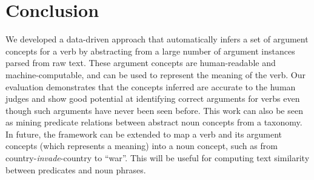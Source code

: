 \section{Conclusion}
\label{sec:conclude}
We developed a data-driven approach that automatically
infers a set of argument concepts for a verb by abstracting from a large
number of argument instances parsed from raw text.
These argument concepts are human-readable and machine-computable,
and can be used to represent the meaning of the verb.
Our evaluation demonstrates that the concepts inferred are
accurate to the human judges and show good potential at
identifying correct arguments for verbs even though such
arguments have never been seen before. This work can also
be seen as mining predicate relations between abstract noun
concepts from a taxonomy. In future, the framework can be
extended to map a verb and its argument concepts (which
represents a meaning) into a noun concept, such as from
country-{\em invade}-country to ``war''. This will be
useful for computing text similarity between predicates and noun phrases.

%
%
